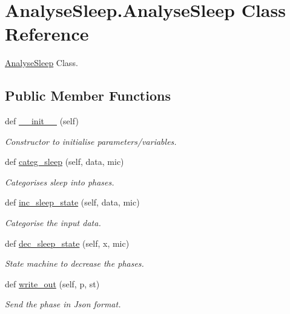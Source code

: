 \hypertarget{class_analyse_sleep_1_1_analyse_sleep}{}\section{Analyse\+Sleep.\+Analyse\+Sleep Class Reference}
\label{class_analyse_sleep_1_1_analyse_sleep}


\mbox{\hyperlink{class_analyse_sleep_1_1_analyse_sleep}{Analyse\+Sleep}} Class.  


\subsection*{Public Member Functions}
\begin{DoxyCompactItemize}
\item 
def \mbox{\hyperlink{class_analyse_sleep_1_1_analyse_sleep_a16f9c6a130cd45c58550943b31f11e8d}{\+\_\+\+\_\+init\+\_\+\+\_\+}} (self)
\begin{DoxyCompactList}\small\item\em Constructor to initialise parameters/variables. \end{DoxyCompactList}\item 
def \mbox{\hyperlink{class_analyse_sleep_1_1_analyse_sleep_aecc34ea1620f4d88b834c13e8440697b}{categ\+\_\+sleep}} (self, data, mic)
\begin{DoxyCompactList}\small\item\em Categorises sleep into phases. \end{DoxyCompactList}\item 
def \mbox{\hyperlink{class_analyse_sleep_1_1_analyse_sleep_a6210c4dfbfae41c5a36989ef1d731dde}{inc\+\_\+sleep\+\_\+state}} (self, data, mic)
\begin{DoxyCompactList}\small\item\em Categorise the input data. \end{DoxyCompactList}\item 
def \mbox{\hyperlink{class_analyse_sleep_1_1_analyse_sleep_a7e990154cc39abd4a1a29caf4f75b95e}{dec\+\_\+sleep\+\_\+state}} (self, x, mic)
\begin{DoxyCompactList}\small\item\em State machine to decrease the phases. \end{DoxyCompactList}\item 
def \mbox{\hyperlink{class_analyse_sleep_1_1_analyse_sleep_a44275bddcab6f7793a6ba0e19bd8b911}{write\+\_\+out}} (self, p, st)
\begin{DoxyCompactList}\small\item\em Send the phase in Json format. \end{DoxyCompactList}\end{DoxyCompactItemize}
